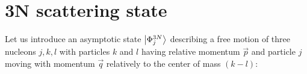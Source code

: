 

    

\section{3N scattering state}

    Let us
    introduce an asymptotic state $\ket{\Phi^{3N}_j}$ describing a free motion
    of three nucleons ${j,k,l}$ with particles $k$ and $l$ 
    having relative momentum $\vec{p}$
    and particle $j$ moving with momentum $\vec{q}$ relatively to the 
    center of mass $(k-l)$:
    
